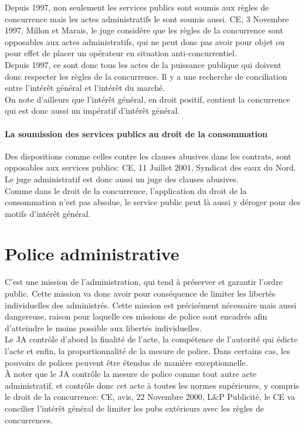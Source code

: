 \documentclass[10pt, a4paper, openany]{book}
\begin{document}
Depuis 1997, non seulement les services publics sont soumis aux règles de concurrence mais les actes administratifs le sont soumis aussi. CE, 3 Novembre 1997, Millon et Marais, le juge considère que les règles de la concurrence sont opposables aux actes administratifs, qui ne peut donc pas avoir pour objet ou pour effet de placer un opérateur en situation anti-concurrentiel. \\
Depuis 1997, ce sont donc tous les actes de la puissance publique qui doivent donc respecter les règles de la concurrence. Il y a une recherche de conciliation entre l'intérêt général et l'intérêt du marché. \\
On note d'ailleurs que l'intérêt général, en droit positif, contient la concurrence qui est donc aussi un impératif d'intérêt général. 

\subsubsection{La soumission des services publics au droit de la consommation}

Des dispositions comme celles contre les clauses abusives dans les contrats, sont opposables aux services publics: CE, 11 Juillet 2001, Syndicat des eaux du Nord. Le juge administratif est donc aussi un juge des clauses abusives. \\
Comme dans le droit de la concurrence, l'application du droit de la consommation n'est pas absolue, le service public peut là aussi y déroger pour des motifs d'intérêt général. 


\chapter{Police administrative}

C'est une mission de l'administration, qui tend à préserver et garantir l'ordre public. Cette mission va donc avoir pour conséquence de limiter les libertés individuelles des administrés. Cette mission est précisément nécessaire mais aussi dangereuse, raison pour laquelle ces missions de police sont encadrés afin d'atteindre le moins possible aux libertés individuelles. \\
Le JA contrôle d'abord la finalité de l'acte, la compétence de l'autorité qui édicte l'acte et enfin, la proportionnalité de la mesure de police. Dans certains cas, les pouvoirs de polices peuvent être étendus de manière exceptionnelle. \\
À noter que le JA contrôle la mesure de police comme tout autre acte administratif, et contrôle donc cet acte à toutes les normes supérieures, y compris le droit de la concurrence: CE, avis, 22 Novembre 2000, L\&P Publicité, le CE va concilier l'intérêt général de limiter les pubs extérieurs avec les règles de concurrences. 
\end{document}
